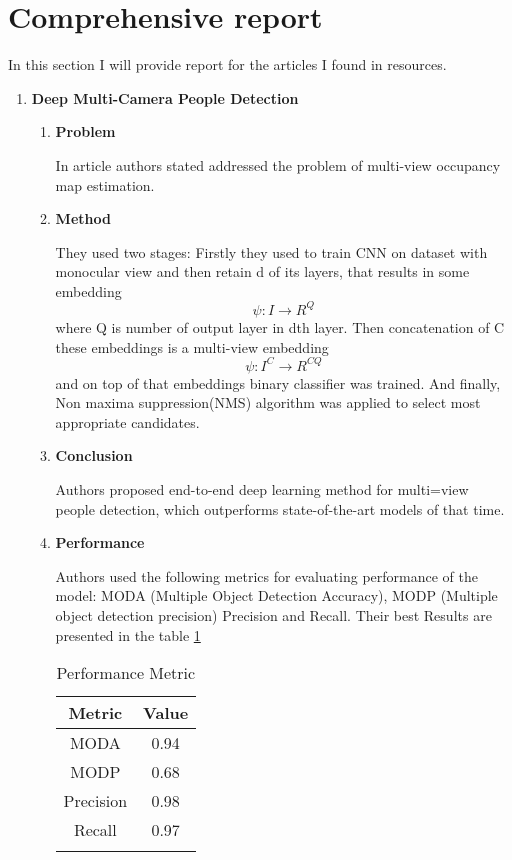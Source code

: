 \section{Comprehensive report}
In this section I will provide report for the articles I found in resources.
\begin{enumerate}
    \item \textbf{Deep Multi-Camera People Detection}
    
    \begin{enumerate}
        \item \textbf{Problem}
        
        In article \cite{chavdarova2017deep} authors stated addressed the problem of multi-view occupancy map estimation.
        \item \textbf{Method}
        
        They used two stages: Firstly they used to train CNN on dataset with monocular view and then retain d of its layers, that results in some embedding  \[\mathit{\psi:} \mathit{I} \rightarrow \mathit{R^Q}\] where Q is number of output layer in dth layer. Then concatenation of C these embeddings is a multi-view embedding \[\psi: \mathit{I^C}\rightarrow R^{CQ}\]and on top of that embeddings binary classifier was trained. And finally, Non maxima suppression(NMS) algorithm was applied to select most appropriate candidates.
        
        \item \textbf{Conclusion}
        
        Authors proposed end-to-end deep learning  method for multi=view people detection, which outperforms state-of-the-art models of that time.
        \item \textbf{Performance}
        
        Authors used the following metrics for evaluating performance of the model: MODA (Multiple Object Detection Accuracy), MODP (Multiple object detection precision) Precision and Recall. Their best Results are presented in the table \ref{tab:deep}
        \\
        
        \begin{center}
            \begin{longtable}{cc}
            \label{tab:deep} \\
            \hline
            Metric & Value\\
            \hline
            MODA & 0.94 \\
            \hline
            MODP & 0.68 \\
            \hline
            Precision & 0.98 \\
            \hline
            Recall & 0.97 \\
            \hline
            \caption[Metrics table for Deep Multi-Camera people detection]{Performance Metric} 
            \end{longtable}
            

\end{center}
\end{enumerate}
\end{enumerate}
